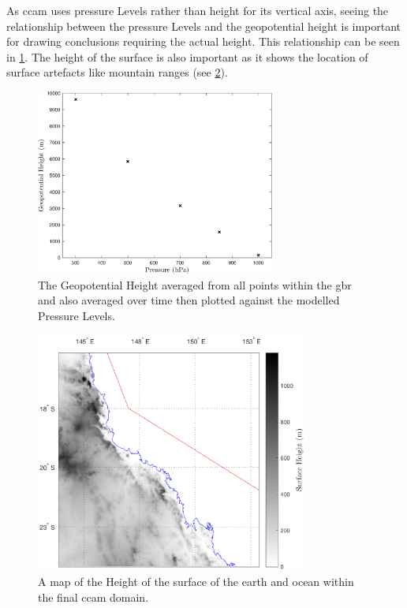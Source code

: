As \gls{ccam} uses pressure Levels rather than height for its vertical axis, seeing the relationship between the pressure Levels and the geopotential height is important for drawing conclusions requiring the actual height. This relationship can be seen in \cref{fig:geoheightvpress}. The height of the surface is also important as it shows the location of surface artefacts like mountain ranges (see \cref{fig:zsmap}).
\begin{figure}[!hbt]
    \centering
    \includegraphics[width=0.7\textwidth]{Fig/Research/CCAM/GBRnTimeAveragedPlot_GeoHeight.eps}
    \caption{ The Geopotential Height averaged from all points within the \gls{gbr} and also averaged over time then plotted against the modelled Pressure Levels. }
    \label{fig:geoheightvpress}
\end{figure}

\begin{figure}[!hbt]
    \centering
    \includegraphics[width=0.8\textwidth]{Fig/Research/CCAM/TimeAveragedMap_zs.eps}
    \vspace{-1cm}
    \caption{ A map of the Height of the surface of the earth and ocean within the final \gls{ccam} domain. }
    \label{fig:zsmap}
\end{figure}

